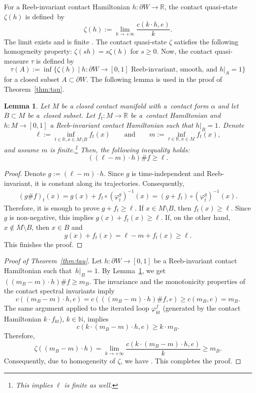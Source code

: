 \documentclass[pdftex]{sigma}
\numberwithin{equation}{section}
\newtheorem{Lemma}[Theorem]{Lemma}
\theoremstyle{definition}
\begin{document}
For a Reeb-invariant contact Hamiltonian $h\colon \partial W\to\mathbb{R}$, the contact quasi-state $\zeta(h)$ is defined~by
\[\zeta(h):= \lim_{k\to+\infty} \frac{c(k\cdot h, e)}{k}.\]
The limit exists and is finite \cite[Lemma~7.2]{djordjevic2025quantitative}. The contact quasi-state $\zeta$ satisfies the following homogeneity property: $\zeta(sh)= s \zeta(h)$ for $s\geqslant 0$. Now, the contact quasi-measure $\tau$ is defined by
\[ \tau(A):= \inf \{ \zeta(h)\mid h\colon\partial W\to[0,1] \text{ Reeb-invariant, smooth, and } h|_A=1 \} \]
for a closed subset $A\subset\partial W$. The following lemma is used in the proof of Theorem~\ref{thm:tau}.

{
\begin{Lemma}\label{lem:aut}
Let $M$ be a closed contact manifold with a~contact form $\alpha$ and let $B\subset M$ be a~closed subset. Let $f_t\colon M\to\mathbb{R}$ be a~contact Hamiltonian and $h\colon M\to[0,1]$ a Reeb-invariant contact Hamiltonian such that $ h |_B=1$. Denote
\[\ell:=\inf_{t\in \mathbb{R}, x\in M\setminus B} f_t(x)\qquad \text{and} \qquad
m:=\inf_{t\in \mathbb{R}, x\in M} f_t(x),\]
and assume $m$ is finite.\footnote{This implies $\ell$ is finite as well.} Then, the following inequality holds:
\[ ((\ell-m)\cdot h)\# f\geqslant \ell. \]
\end{Lemma}}
\begin{proof}
Denote $g:=(\ell-m)\cdot h$. Since $g$ is time-independent and Reeb-invariant, it is constant along its trajectories. Consequently,
\begin{align*}
(g\# f)_t(x) = g(x) + f_t\circ (\varphi^{g}_t )^{-1}(x) = (g + f_t)\circ (\varphi^{g}_t )^{-1}(x).
\end{align*}
Therefore, it is enough to prove $g+f_t\geqslant \ell$. If $x\in {M\setminus B}$, then $f_t(x)\geqslant \ell$. Since $g$ is non-negative, this implies $g(x)+ f_t(x)\geqslant \ell$. If, on the other hand, $x\not \in {M\setminus B}$, then $x\in B$ and
\[ g(x) + f_t(x)= \ell-m + f_t(x)\geqslant \ell. \]
This finishes the proof.
\end{proof}

\begin{proof}[Proof of Theorem~\ref{thm:tau}]
Let $h\colon\partial W\to[0,1]$ be a Reeb-invariant contact Hamiltonian such that~${ h |_B=1}$. By Lemma~\ref{lem:aut}, we get $ ((m_B-m)\cdot h )\#f\geqslant m_B$. The {invariance} and the monotonicity properties of the contact spectral invariants imply
\[c((m_B-m)\cdot h, e)= c ( ((m_B-m)\cdot h )\#f, e )\geqslant c(m_B, e)=m_B.\]
The same argument applied to the iterated loop $\varphi^f_{kt}$ (generated by the contact Hamiltonian ${k\cdot f_{kt}}$), $k\in\mathbb{N}$, implies
\[c(k\cdot(m_B-m)\cdot h, e)\geqslant k\cdot m_B.\]
Therefore,
\[\zeta((m_B-m)\cdot h)= \lim_{k\to+\infty} \frac{c(k\cdot(m_B-m)\cdot h, e)}{k}\geqslant m_B. \]
Consequently, due to homogeneity of $\zeta$, we have . This completes the proof.
\end{proof}
\end{document}
